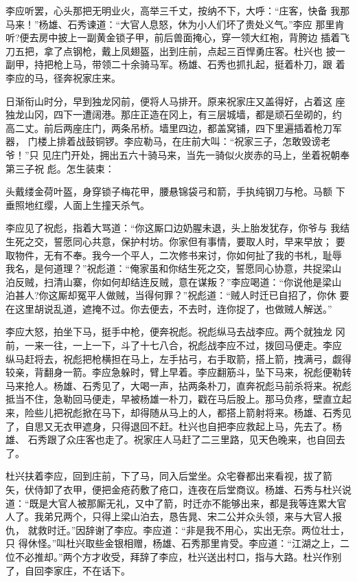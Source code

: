 李应听罢，心头那把无明业火，高举三千丈，按纳不下，大呼：“庄客，快备
我那马来！”杨雄、石秀谏道：“大官人息怒，休为小人们坏了贵处义气。”李应
那里肯听?便去房中披上一副黄金锁子甲，前后兽面掩心，穿一领大红袍，背胯边
插着飞刀五把，拿了点钢枪，戴上凤翅盔，出到庄前，点起三百悍勇庄客。杜兴也
披一副甲，持把枪上马，带领二十余骑马军。杨雄、石秀也抓扎起，挺着朴刀，跟
着李应的马，径奔祝家庄来。

日渐衔山时分，早到独龙冈前，便将人马排开。原来祝家庄又盖得好，占着这
座独龙山冈，四下一遭阔港。那庄正造在冈上，有三层城墙，都是顽石垒砌的，约
高二丈。前后两座庄门，两条吊桥。墙里四边，都盖窝铺，四下里遍插着枪刀军器，
门楼上排着战鼓铜锣。李应勒马，在庄前大叫：“祝家三子，怎敢毁谤老爷！”只
见庄门开处，拥出五六十骑马来，当先一骑似火炭赤的马上，坐着祝朝奉第三子祝
彪。怎生装束：

头戴缕金荷叶盔，身穿锁子梅花甲，腰悬锦袋弓和箭，手执纯钢刀与枪。马额
下垂照地红缨，人面上生撞天杀气。

李应见了祝彪，指着大骂道：“你这厮口边奶腥未退，头上胎发犹存，你爷与
我结生死之交，誓愿同心共意，保护村坊。你家但有事情，要取人时，早来早放；
要取物件，无有不奉。我今一个平人，二次修书来讨，你如何扯了我的书札，耻辱
我名，是何道理？”祝彪道：“俺家虽和你结生死之交，誓愿同心协意，共捉梁山
泊反贼，扫清山寨，你如何却结连反贼，意在谋叛？”李应喝道：“你说他是梁山
泊甚人?你这厮却冤平人做贼，当得何罪？”祝彪道：“贼人时迁已自招了，你休
要在这里胡说乱道，遮掩不过。你去便去，不去时，连你捉了，也做贼人解送。”

李应大怒，拍坐下马，挺手中枪，便奔祝彪。祝彪纵马去战李应。两个就独龙
冈前，一来一往，一上一下，斗了十七八合，祝彪战李应不过，拨回马便走。李应
纵马赶将去，祝彪把枪横担在马上，左手拈弓，右手取箭，搭上箭，拽满弓，觑得
较亲，背翻身一箭。李应急躲时，臂上早着。李应翻筋斗，坠下马来，祝彪便勒转
马来抢人。杨雄、石秀见了，大喝一声，拈两条朴刀，直奔祝彪马前杀将来。祝彪
抵当不住，急勒回马便走，早被杨雄一朴刀，戳在马后股上。那马负疼，壁直立起
来，险些儿把祝彪掀在马下，却得随从马上的人，都搭上箭射将来。杨雄、石秀见
了，自思又无衣甲遮身，只得退回不赶。杜兴也自把李应救起上马，先去了。杨雄、
石秀跟了众庄客也走了。祝家庄人马赶了二三里路，见天色晚来，也自回去了。

杜兴扶着李应，回到庄前，下了马，同入后堂坐。众宅眷都出来看视，拔了箭
矢，伏侍卸了衣甲，便把金疮药敷了疮口，连夜在后堂商议。杨雄、石秀与杜兴说
道：“既是大官人被那厮无礼，又中了箭，时迁亦不能够出来，都是我等连累大官
人了。我弟兄两个，只得上梁山泊去，恳告晁、宋二公并众头领，来与大官人报仇，
就救时迁。”因辞谢了李应。李应道：“非是我不用心，实出无奈。两位壮士，只
得休怪。”叫杜兴取些金银相赠，杨雄、石秀那里肯受。李应道：“江湖之上，二
位不必推却。”两个方才收受，拜辞了李应，杜兴送出村口，指与大路。杜兴作别
了，自回李家庄，不在话下。

